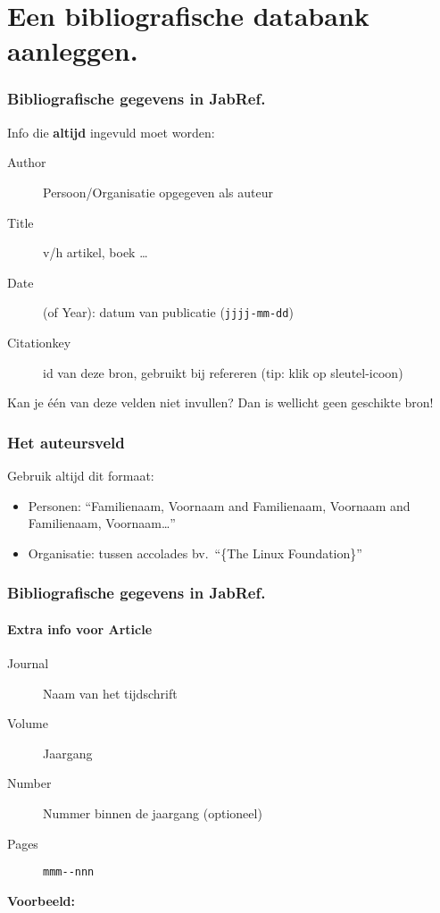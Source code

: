 \documentclass[aspectratio=169]{beamer}
\begin{document}
\section{Een bibliografische databank aanleggen.}

\begin{frame}
  \frametitle{Bibliografische gegevens in JabRef.}

  Info die \textbf{altijd} ingevuld moet worden:

  \begin{description}
    \item[Author] Persoon/Organisatie opgegeven als auteur
    \item[Title] v/h artikel, boek \ldots
    \item[Date] (of Year): datum van publicatie (\texttt{jjjj-mm-dd})
    \item[Citationkey] id van deze bron, gebruikt bij refereren (tip: klik op sleutel-icoon)
  \end{description}

  \bigskip

  Kan je één van deze velden niet invullen? Dan is wellicht geen geschikte bron!
\end{frame}

\begin{frame}
  \frametitle{Het auteursveld}

  Gebruik altijd dit formaat:

  \begin{itemize}
    \item Personen: ``Familienaam, Voornaam and Familienaam, Voornaam and Familienaam, Voornaam\ldots''
    \item Organisatie: tussen accolades bv.\ ``\{The Linux Foundation\}''
  \end{itemize}

\end{frame}

\begin{frame}
  \frametitle{Bibliografische gegevens in JabRef.}
  \framesubtitle{Extra info voor Article}

  \begin{description}
    \item[Journal] Naam van het tijdschrift
    \item[Volume] Jaargang
    \item[Number] Nummer binnen de jaargang (optioneel)
    \item[Pages] \verb|mmm--nnn|
  \end{description}

  \bigskip

  \textbf{Voorbeeld:}

\end{frame}
\end{document}
